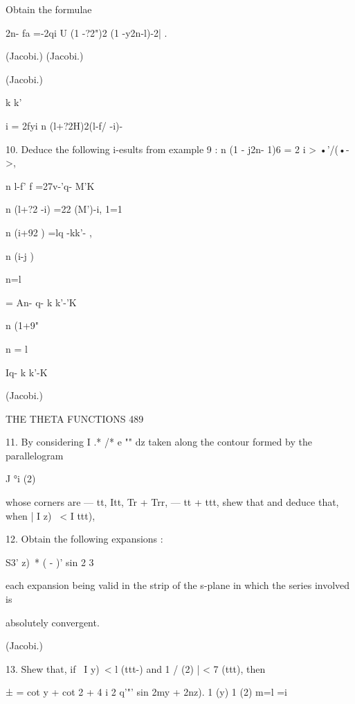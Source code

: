 Obtain the formulae 

2n- fa =-2qi U  (1 -?2")2 (1 -y2n-l)-2| . 



(Jacobi.) 
(Jacobi.) 



(Jacobi.) 



k k' 



i = 2fyi n  (l+?2H)2(l-f/ -i)- 



10. Deduce the following i-esults from example 9 : 
n (1 - j2n- 1)6 = 2 i > •'/(•->, 



n  l-f' f =27v-'q- M'K\ 



n (l+?2 -i) =22 (M')-i, 
1=1 

n (i+92 )  =lq -kk'- , 



n (i-j )  

n=l 



= An- q- k k'-'K\ 



n (1+9" 

n = l 



Iq- k k'-K 



(Jacobi.) 



THE THETA FUNCTIONS 489 

11. By considering I .* /* e "" dz taken along the contour formed by the parallelogram 

J °i (2) 

whose corners are —  tt, Itt,  Tr + Trr, —  tt + ttt, shew that 
and deduce that, when | I z) \ < I ttt), 

12. Obtain the following expansions : 

S3' z)\  * ( - )'   sin 2 3 

each expansion being valid in the strip of the s-plane in which the series involved is 

absolutely convergent. 

(Jacobi.) 

13. Shew that, if \ I y)\ < l (ttt-) and 1 / (2) | < 7 (ttt), then 

  ± = cot y + cot 2 + 4 i 2 q'"'  sin  2my + 2nz). 
 1 (y)  1 (2) m=l  =i 

